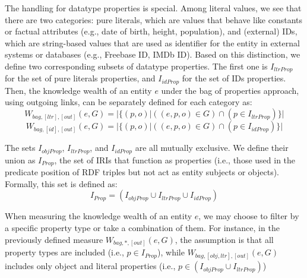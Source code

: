 The handling for datatype properties is special. Among literal values, we see that there are two categories: pure literals, which are values that behave like constants or factual attributes (e.g., date of birth, height, population), and (external) IDs, which are string-based values that are used as identifier for the entity in external systems or databases (e.g., Freebase ID, IMDb ID). Based on this distinction, we define two corresponding subsets of datatype properties. The first one is \(I_{ltrProp}\) for the set of pure literals properties, and \(I_{idProp}\) for the set of IDs properties. Then, the knowledge wealth of an entity \(e\) under the bag of properties approach, using outgoing links, can be separately defined for each category as:
\[
    W_{bag,[ltr],[out]}(e,G) = |\{(p,o) | ((e, p, o) \in G) \cap (p \in I_{ltrProp})\}|
\]
\[
    W_{bag,[id],[out]}(e,G) = |\{(p,o) | ((e, p, o) \in G) \cap (p \in I_{idProp})\}|
\]

The sets \(I_{objProp}\), \(I_{ltrProp}\), and \(I_{idProp}\) are all mutually exclusive. We define their union as \(I_{Prop}\), the set of IRIs that function as properties (i.e., those used in the predicate position of RDF triples but not act as entity subjects or objects). Formally, this set is defined as:
\[
    I_{Prop} = (I_{objProp} \cup I_{ltrProp} \cup I_{idProp})
\]

When measuring the knowledge wealth of an entity \(e\), we may choose to filter by a specific property type or take a combination of them. For instance, in the previously defined measure \(W_{bag, *, [out]}(e,G)\), the assumption is that all property types are included (i.e., \(p \in I_{Prop}\)), while \(W_{bag, [obj, ltr], [out]}(e,G)\) includes only object and literal properties (i.e., \(p \in (I_{objProp} \cup I_{ltrProp})\))



